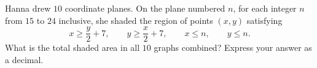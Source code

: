 Hanna drew $10$ coordinate planes. On the plane numbered $n$, for each integer $n$ from $15$ to $24$ inclusive, she shaded the region of points $(x,y)$ satisfying
\[x\ge\dfrac y2+7,\qquad y\ge\dfrac x2+7,\qquad x\le n,\qquad y\le n.\]
What is the total shaded area in all $10$ graphs combined? Express your answer as a decimal.
